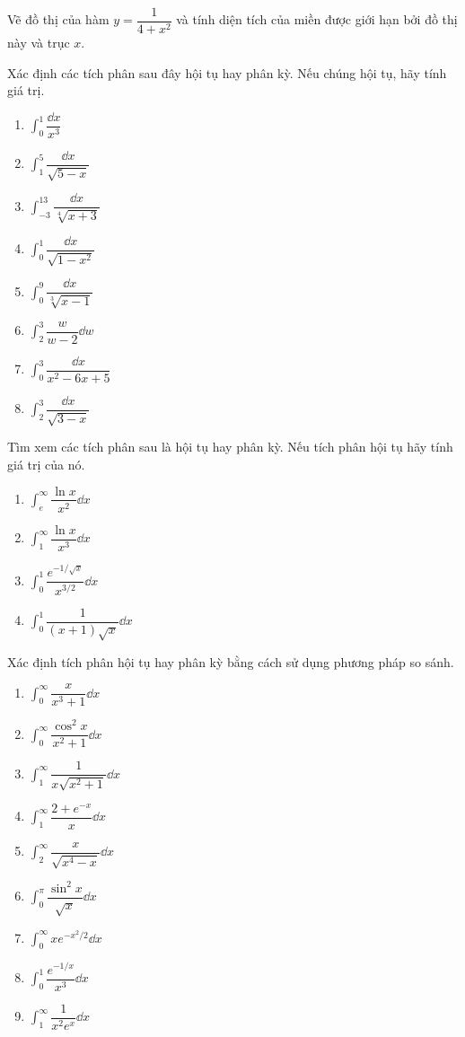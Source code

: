 \begin{exercise}
    Vẽ đồ thị của hàm $y = \dfrac{1}{4+x^2}$ và tính diện tích của miền được giới hạn bởi đồ thị này và trục $x$.
\end{exercise}

\begin{exercise}
    Xác định các tích phân sau đây hội tụ hay phân kỳ. Nếu chúng hội tụ, hãy tính giá trị.
    \begin{enumerate}[label=(\alph*)]
        \item $\int_0^1 \dfrac{\dd x}{x^3}$
        \item $\int_1^5 \dfrac{\dd x}{\sqrt{5-x}}$
        \item $\int_{-3}^{13} \dfrac{\dd x}{\sqrt[4]{x+3}}$
        \item $\int_0^1 \dfrac{\dd x}{\sqrt{1-x^2}}$
        \item $\int_0^9 \dfrac{\dd x}{\sqrt[3]{x-1}}$
        \item $\int_2^3 \dfrac{w}{w-2} \dd w$
        \item $\int_0^3 \dfrac{\dd x}{x^2-6x+5}$
        \item $\int_2^3 \dfrac{\dd x}{\sqrt{3-x}}$
    \end{enumerate}
\end{exercise}

\begin{exercise}
    Tìm xem các tích phân sau là hội tụ hay phân kỳ. Nếu tích phân hội tụ hãy tính giá trị của nó.
    \begin{enumerate}[label=(\alph*)]
        \item $\int_e^\infty \dfrac{\ln x}{x^2} \dd x$
        \item $\int_1^\infty \dfrac{\ln x}{x^3} \dd x$
        \item $\int_0^1 \dfrac{e^{-1/\sqrt{x}}}{x^{3/2}} \dd x$
        \item $\int_0^1 \dfrac{1}{(x+1)\sqrt{x}} \dd x$
    \end{enumerate}
\end{exercise}

\begin{exercise}
    Xác định tích phân hội tụ hay phân kỳ bằng cách sử dụng phương pháp so sánh.
    \begin{enumerate}[label=(\alph*)]
        \item $\int_0^\infty \dfrac{x}{x^3+1} \dd x$
        \item $\int_0^\infty \dfrac{\cos^2 x}{x^2+1} \dd x$
        \item $\int_1^\infty \dfrac{1}{x\sqrt{x^2+1}} \dd x$
        \item $\int_1^\infty \dfrac{2+e^{-x}}{x} \dd x$
        \item $\int_2^\infty \dfrac{x}{\sqrt{x^4-x}} \dd x$
        \item $\int_0^\pi \dfrac{\sin^2 x}{\sqrt{x}} \dd x$
        \item $\int_0^\infty xe^{-x^2/2} \dd x$
        \item $\int_0^1 \dfrac{e^{-1/x}}{x^3} \dd x$
        \item $\int_1^\infty \dfrac{1}{x^2e^x} \dd x$
    \end{enumerate}
\end{exercise}

